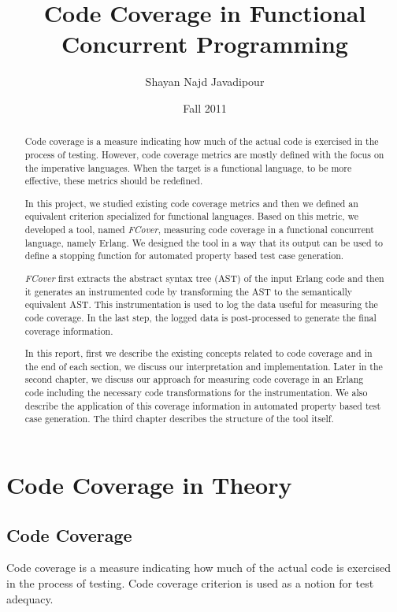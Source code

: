 \documentclass[12pt,a4paper]{report}
\title{Code Coverage in Functional Concurrent Programming}
\author{Shayan Najd Javadipour}
\date{Fall 2011}
\begin{document}
\maketitle
\begin{abstract}
Code coverage is a measure indicating how much of the actual code is exercised in the process of testing. However, code coverage metrics are mostly defined with the focus on the imperative languages. When the target is a functional language, to be more effective, these metrics should be redefined.

In this project, we studied existing code coverage metrics and then we defined an equivalent criterion specialized for functional languages. Based on this metric, we developed a tool, named \emph{FCover}, measuring code coverage in a functional concurrent language, namely Erlang. We designed the tool in a way that its output can be used to define a stopping function for automated property based test case generation.

\emph{FCover} first extracts the abstract syntax tree (AST) of the input Erlang code and then it generates an instrumented code by transforming the AST to the semantically equivalent AST. This instrumentation is used to log the data useful for measuring the code coverage. In the last step, the logged data is post-processed to generate the final coverage information.  

In this report, first we describe the existing concepts related to code coverage and in the end of each section, we discuss our interpretation and implementation. Later in the second chapter, we discuss our approach for measuring code coverage in an Erlang code including the necessary code transformations for the instrumentation. We also describe the application of this coverage information in automated property based test case generation. The third chapter describes the structure of the tool itself. 
\end{abstract}
\tableofcontents
\chapter{Code Coverage in Theory}
\newpage
\section{Code Coverage}
Code coverage is a measure indicating how much of the actual code is exercised in the process of testing. Code coverage criterion is used as a notion for test adequacy.\cite{Zhu:1997:SUT:267580.267590}
\end{document}
